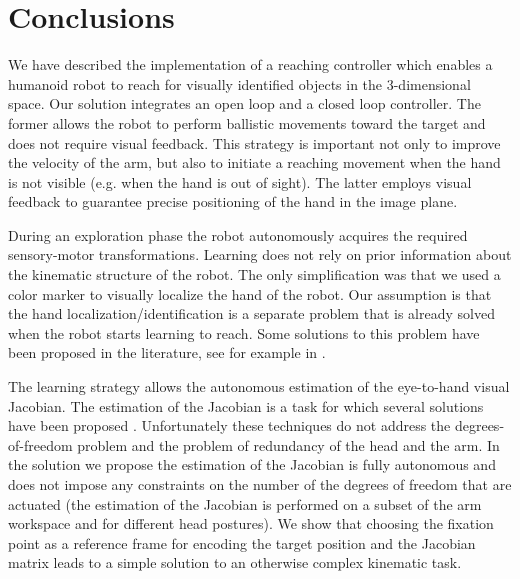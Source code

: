 \section{Conclusions}
We have described the implementation of a reaching controller which 
enables a humanoid robot to reach for visually identified objects 
in the 3-dimensional space. Our solution integrates an open loop and 
a closed loop controller. The former allows the robot to perform 
ballistic movements toward the target and does not require visual feedback.
This strategy is important not only to improve the velocity of the arm, but 
also to initiate a reaching movement when the hand is not visible (e.g. 
when the hand is out of sight). The latter employs visual feedback to guarantee precise positioning of the hand in the image plane.

During an exploration phase the robot autonomously acquires the required 
sensory-motor transformations. Learning does not rely on prior information 
about the kinematic structure of the robot. The only simplification was 
that we used a color marker to visually localize the hand of the robot. 
Our assumption is that the hand localization/identification is a separate 
problem that is already solved when the robot starts learning to reach. 
Some solutions to this problem have been proposed in the literature, 
see for example in \cite{Natale05,edsinger06what}.

The learning strategy allows the autonomous estimation of the eye-to-hand visual 
Jacobian. The estimation of the Jacobian is a task for which 
several solutions have been proposed 
\cite{Hosoda94versatile,Mansard06jacobian,Lapreste04efficient,scaz07fast}.
Unfortunately these techniques do not address the degrees-of-freedom problem 
and the problem of redundancy of the head and the arm. In the solution we
propose the estimation of the Jacobian is fully autonomous and 
does not impose any constraints on the number of the degrees of freedom
that are actuated (the estimation of the Jacobian is performed on a subset 
of the arm workspace and for different head postures). We show that 
choosing the fixation point as a reference frame for encoding the target 
position and the Jacobian matrix leads to a simple solution to an otherwise 
complex kinematic task.

